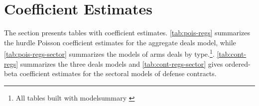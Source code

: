 \documentclass[12pt]{article}
\begin{document}
\newpage

\section{Coefficient Estimates}

The section presents tables with coefficient estimates. 
\autoref{tab:pois-regs} summarizes the hurdle Poisson coefficient estimates for the aggregate deals model, while \autoref{tab:pois-regs-sector} summarizes the models of arms deals by type.\footnote{All tables built with modelsummary \citep{ArelBundock2022}}. 
\autoref{tab:cont-regs} summarizes the three deals models and \autoref{tab:cont-regs-sector} gives ordered-beta coefficient estimates for the sectoral models of defense contracts. 











\newpage
\singlespace
 
 
\end{document}
